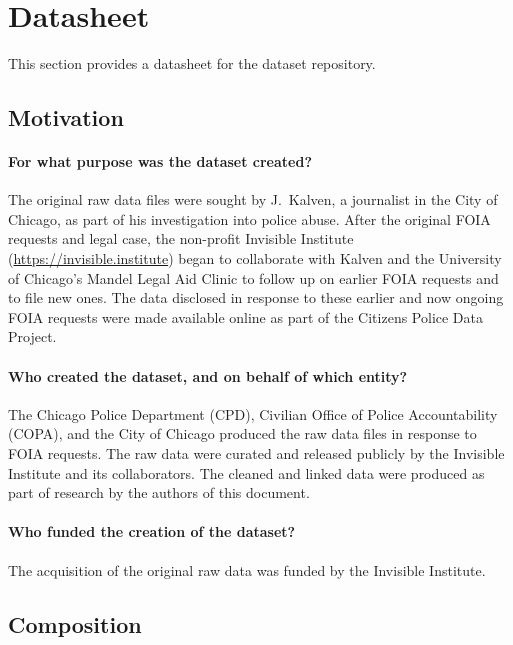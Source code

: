 \section{Datasheet}\label{sec:datasheet}

This section provides a datasheet \citep{Gebru18} for the dataset repository.

\subsection{Motivation}

\paragraph{For what purpose was the dataset created?}
The original raw data files were sought by J.~Kalven, a journalist in the City
of Chicago, as part of his investigation into police abuse. After the original
FOIA requests and legal case, the non-profit Invisible Institute (\url{https://invisible.institute}) 
began to collaborate with Kalven and the University of Chicago's Mandel Legal Aid Clinic
to follow up on earlier FOIA requests and to file new ones. The data disclosed
in response to these earlier and now ongoing FOIA requests were made available
online as part of the Citizens Police Data Project.

\paragraph{Who created the dataset, and on behalf of which entity?}
The Chicago Police Department (CPD), Civilian Office of Police Accountability
(COPA), and the City of Chicago produced the raw data files in response to FOIA
requests. The raw data were curated and released publicly by the Invisible
Institute and its collaborators. The cleaned and linked data were produced
as part of research by the authors of this document.

\paragraph{Who funded the creation of the dataset?}
The acquisition of the original raw data was funded by the Invisible Institute.

\subsection{Composition}

